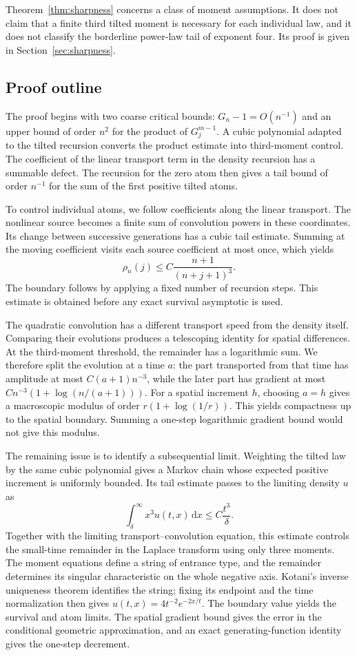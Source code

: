 \documentclass[11pt,letterpaper,reqno]{amsart}
\theoremstyle{plain}
\newcommand{\dd}{\,\mathrm d}
\begin{document}
Theorem~\ref{thm:sharpness} concerns a class of moment assumptions. It does not claim that a finite third tilted moment is necessary for each individual law, and it does not classify the borderline power-law tail of exponent four. Its proof is given in Section~\ref{sec:sharpness}.

\subsection{Proof outline}
The proof begins with two coarse critical bounds: $G_n-1=O(n^{-1})$ and an upper bound of order $n^2$ for the product of $G_j^{m-1}$. A cubic polynomial adapted to the tilted recursion converts the product estimate into third-moment control. The coefficient of the linear transport term in the density recursion has a summable defect. The recursion for the zero atom then gives a tail bound of order $n^{-1}$ for the sum of the first positive tilted atoms.

To control individual atoms, we follow coefficients along the linear transport. The nonlinear source becomes a finite sum of convolution powers in these coordinates. Its change between successive generations has a cubic tail estimate. Summing at the moving coefficient visits each source coefficient at most once, which yields
\[
 \rho_n(j)\le C\frac{n+1}{(n+j+1)^3}.
\]
The boundary follows by applying a fixed number of recursion steps. This estimate is obtained before any exact survival asymptotic is used.

The quadratic convolution has a different transport speed from the density itself. Comparing their evolutions produces a telescoping identity for spatial differences. At the third-moment threshold, the remainder has a logarithmic sum. We therefore split the evolution at a time $a$: the part transported from that time has amplitude at most $C(a+1)n^{-3}$, while the later part has gradient at most $Cn^{-3}(1+\log(n/(a+1)))$. For a spatial increment $h$, choosing $a=h$ gives a macroscopic modulus of order $r(1+\log(1/r))$. This yields compactness up to the spatial boundary. Summing a one-step logarithmic gradient bound would not give this modulus.

The remaining issue is to identify a subsequential limit. Weighting the tilted law by the same cubic polynomial gives a Markov chain whose expected positive increment is uniformly bounded. Its tail estimate passes to the limiting density $u$ as
\[
 \int_\delta^\infty x^3u(t,x)\dd x\le C\frac{t^3}{\delta}.
\]
Together with the limiting transport--convolution equation, this estimate controls the small-time remainder in the Laplace transform using only three moments. The moment equations define a string of entrance type, and the remainder determines its singular characteristic on the whole negative axis. Kotani's inverse uniqueness theorem identifies the string; fixing its endpoint and the time normalization then gives $u(t,x)=4t^{-2}e^{-2x/t}$. The boundary value yields the survival and atom limits. The spatial gradient bound gives the error in the conditional geometric approximation, and an exact generating-function identity gives the one-step decrement.
\end{document}
